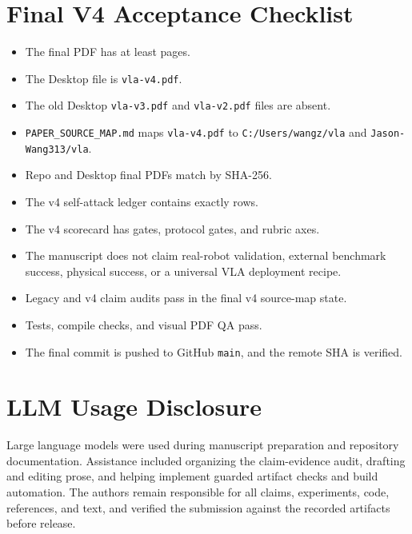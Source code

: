 \documentclass{article}
\begin{document}
\section{Final V4 Acceptance Checklist}
\label{app:final-checklist}

\begin{itemize}
\item The final PDF has at least \VFourMinPages{} pages.
\item The Desktop file is \texttt{vla-v4.pdf}.
\item The old Desktop \texttt{vla-v3.pdf} and \texttt{vla-v2.pdf} files are absent.
\item \texttt{PAPER\_SOURCE\_MAP.md} maps \texttt{vla-v4.pdf} to \texttt{C:/Users/wangz/vla} and \texttt{Jason-Wang313/vla}.
\item Repo and Desktop final PDFs match by SHA-256.
\item The v4 self-attack ledger contains exactly \VFourAttackRounds{} rows.
\item The v4 scorecard has \VFourScorecardRows{} gates, \VFourProtocolGates{} protocol gates, and \VFourRubricAxes{} rubric axes.
\item The manuscript does not claim real-robot validation, external benchmark success, physical success, or a universal VLA deployment recipe.
\item Legacy and v4 claim audits pass in the final v4 source-map state.
\item Tests, compile checks, and visual PDF QA pass.
\item The final commit is pushed to GitHub \texttt{main}, and the remote SHA is verified.
\end{itemize}

\section{LLM Usage Disclosure}
\label{app:llm}

Large language models were used during manuscript preparation and repository documentation. Assistance included organizing the claim-evidence audit, drafting and editing prose, and helping implement guarded artifact checks and build automation. The authors remain responsible for all claims, experiments, code, references, and text, and verified the submission against the recorded artifacts before release.
\end{document}
